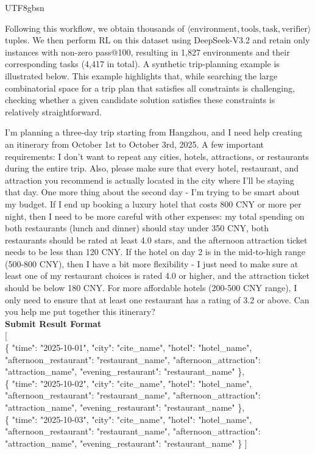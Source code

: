 \documentclass[11pt, a4paper, logo, copyright, nonumbering]{deepseek}
\def\newmodel{DeepSeek-V3.2}
\begin{document}
\begin{CJK*}{UTF8}{gbsn}
\begin{enumerate}
\end{enumerate}

Following this workflow, we obtain thousands of $⟨\text{environment}, \text{tools}, \text{task}, \text{verifier}⟩$ tuples. We then perform RL on this dataset using \newmodel{} and retain only instances with non-zero pass@100, resulting in 1,827 environments and their corresponding tasks (4,417 in total). A synthetic trip-planning example is illustrated below. This example highlights that, while searching the large combinatorial space for a trip plan that satisfies all constraints is challenging, checking whether a given candidate solution satisfies these constraints is relatively straightforward.
\begin{tcolorbox}[
  floatplacement=ht,    
  title={An Example of Synthesized Task: Trip Planning}, 
  label={case:trip_request}             
]
\small
I'm planning a three-day trip starting from Hangzhou, and I need help creating an itinerary from October 1st to October 3rd, 2025. 
A few important requirements: I don't want to repeat any cities, hotels, attractions, or restaurants during the entire trip. Also, please make sure that every hotel, restaurant, and attraction you recommend is actually located in the city where I'll be staying that day.
One more thing about the second day - I'm trying to be smart about my budget. If I end up booking a luxury hotel that costs 800 CNY or more per night, then I need to be more careful with other expenses: my total spending on both restaurants (lunch and dinner) should stay under 350 CNY, both restaurants should be rated at least 4.0 stars, and the afternoon attraction ticket needs to be less than 120 CNY.
If the hotel on day 2 is in the mid-to-high range (500-800 CNY), then I have a bit more flexibility - I just need to make sure at least one of my restaurant choices is rated 4.0 or higher, and the attraction ticket should be below 180 CNY.
For more affordable hotels (200-500 CNY range), I only need to ensure that at least one restaurant has a rating of 3.2 or above.
Can you help me put together this itinerary? \\[0.2em]

\textbf{Submit Result Format} \\[0.2em]

[
\\[0.2em]
  \{
    "time": "2025-10-01",
    "city": "cite\_name",
    "hotel": "hotel\_name",
    "afternoon\_restaurant": "restaurant\_name",
    "afternoon\_attraction": "attraction\_name",
    "evening\_restaurant": "restaurant\_name"
  \},
  \\[0.2em]
  \{
    "time": "2025-10-02",
    "city": "cite\_name",
    "hotel": "hotel\_name",
    "afternoon\_restaurant": "restaurant\_name",
    "afternoon\_attraction": "attraction\_name",
    "evening\_restaurant": "restaurant\_name"
  \},
  \\[0.2em]
  \{
    "time": "2025-10-03",
    "city": "cite\_name",
    "hotel": "hotel\_name",
    "afternoon\_restaurant": "restaurant\_name",
    "afternoon\_attraction": "attraction\_name",
    "evening\_restaurant": "restaurant\_name"
  \}
]
\end{tcolorbox}


\end{CJK*}
\end{document}
